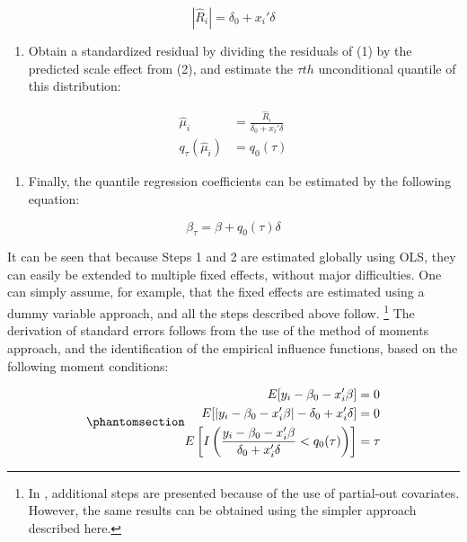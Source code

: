\documentclass[bib]{statapress}
\providecommand{\tightlist}{%
  \setlength{\itemsep}{0pt}\setlength{\parskip}{0pt}}\usepackage{longtable,booktabs,array}
\begin{document}
\[|\hat R_i| = \delta_0 + x_{i}' \delta\]

\begin{enumerate}
\def\labelenumi{\arabic{enumi}.}
\setcounter{enumi}{2}
\tightlist
\item
  Obtain a standardized residual by dividing the residuals of (1) by the
  predicted scale effect from (2), and estimate the \(\tau th\)
  unconditional quantile of this distribution:
\end{enumerate}

\[\begin{aligned}
\hat \mu_i &= \frac{\hat R_i}{\delta_0 + x_{i}' \delta} \\
q_{\tau}(\hat \mu_i) &= q_0(\tau)
\end{aligned}
\]

\begin{enumerate}
\def\labelenumi{\arabic{enumi}.}
\setcounter{enumi}{3}
\tightlist
\item
  Finally, the quantile regression coefficients can be estimated by the
  following equation:
\end{enumerate}

\[\beta_{\tau} = \beta + q_0(\tau) \delta
\]

It can be seen that because Steps 1 and 2 are estimated globally using
OLS, they can easily be extended to multiple fixed effects, without
major difficulties. One can simply assume, for example, that the fixed
effects are estimated using a dummy variable approach, and all the steps
described above follow. \footnote{In \citet{riosavila2024}, additional
  steps are presented because of the use of partial-out covariates.
  However, the same results can be obtained using the simpler approach
  described here.} The derivation of standard errors follows from the
use of the method of moments approach, and the identification of the
empirical influence functions, based on the following moment conditions:

\begin{equation}\phantomsection\label{eq-mmqreg-moments}{\begin{aligned}
E[y_{i} - \beta_0 - x_{i}' \beta] &= 0 \\
E[|y_{i} - \beta_0 - x_{i}' \beta|- \delta_0 + x_{i}' \delta] &= 0 \\
E\left[ I\left(\frac{y_{i} - \beta_0 - x_{i}' \beta}{\delta_0 + x_{i}' \delta} < q_0(\tau)\right) \right] &= \tau
\end{aligned}
}\end{equation}
\end{document}
